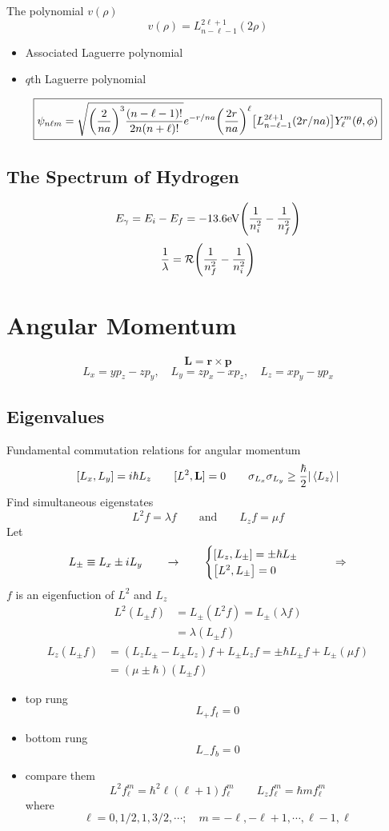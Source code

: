 The polynomial \(v(\rho)\)
\[v(\rho) = L^{2\ell+1}_{n-\ell-1}(2\rho)\]
\begin{itemize}
       \item Associated Laguerre polynomial
       \item \(q\)th Laguerre polynomial
\end{itemize}

$${\boxed{  
       \psi_{n\ell m} = 
       \sqrt{\qty(\frac{2}{na})^3\frac{(n-\ell-1)!}{2n(n+\ell)!}}
       e^{-r/na} 
       \qty(\frac{2r}{na})^ \ell
       \qty[L_{n-\ell-1}^{2\ell+1}(2r/na)] 
         Y_\ell^m(\theta,\phi) 
}}$$
\subsection{The Spectrum of Hydrogen}
\[E_\gamma = E_i - E_f = -13.6 \mathrm{eV}\qty(\frac{1}{n^2_i}-\frac{1}{n_f^2})\]
\[\frac{1}{\lambda} = \mathcal{R} \qty(\frac{1}{n^2_f}-\frac{1}{n_i^2})\]
\section{Angular Momentum}
\[\mathbf{L} = \mathbf{r}\times\mathbf{p}\]
\[L_x = yp_z-zp_y,\quad L_y=zp_x-xp_z,\quad L_z = xp_y-yp_x\]
\subsection{Eigenvalues}
Fundamental commutation relations for angular momentum
\[[L_x,L_y] = i\hbar L_z\qquad [L^2,\mathbf{L} ]= 0\qquad 
\sigma_{L_x}\sigma_{L_y}\geq\frac{\hbar}{2}|\expval{L_z}|\]
Find simultaneous eigenstates 
\[L^2f=\lambda f \qquad\text{and}\qquad L_zf=\mu f\]
Let \[L_\pm\equiv L_x\pm iL_y \qquad\rightarrow\qquad
\begin{cases}
       \qty[L_z,L_\pm] = \pm\hbar L_\pm \\
       \qty[L^2,L_\pm]=0
\end{cases}\qquad\Rightarrow\]
\(f\) is an eigenfuction of \(L^2\) and \(L_z\)
\[\begin{aligned}
       L^2(L_\pm f) &=L_\pm(L^2 f) = L_{\pm}(\lambda f) \\
                   & = \lambda(L_\pm f)
\end{aligned}\]
\[
\begin{aligned}
       L_z(L_\pm f)&=(L_zL_\pm - L_\pm L_z)f + L_\pm L_z f = \pm \hbar L_\pm f+ L_\pm(\mu f) \\
                   & = (\mu\pm\hbar)(L_{\pm}f)
\end{aligned}\]
\begin{itemize}
       \item top rung\[L_+f_t=0\]
       \item bottom rung \[L_-f_b=0\]
       \item compare them 
       \[\boxed{L^2f_\ell^m=\hbar^2\ell(\ell+1)f_\ell^m\qquad
        L_zf_\ell^m=\hbar mf_\ell^m}\]
        where\[\ell = 0,1/2,1,3/2,\cdots; \quad m=-\ell,-\ell+1,\cdots,\ell-1,\ell\]
\end{itemize}
